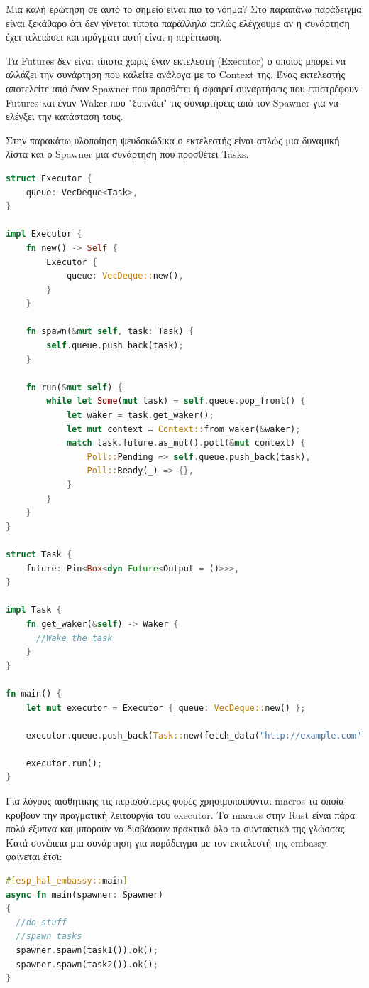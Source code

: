 Μια καλή ερώτηση σε αυτό το σημείο είναι πιο το νόημα? Στο παραπάνω παράδειγμα
είναι ξεκάθαρο ότι δεν γίνεται τίποτα παράλληλα απλώς ελέγχουμε αν η συνάρτηση
έχει τελειώσει και πράγματι αυτή είναι η περίπτωση.

Τα Futures δεν είναι τίποτα χωρίς έναν εκτελεστή (Executor) ο οποίος μπορεί να αλλάζει
την συνάρτηση που καλείτε ανάλογα με το Context της. Ένας εκτελεστής αποτελείτε από
έναν Spawner που προσθέτει ή αφαιρεί συναρτήσεις που επιστρέφουν Futures και έναν Waker
που "ξυπνάει" τις συναρτήσεις από τον Spawner για να ελέγξει την κατάσταση τους.

Στην παρακάτω υλοποίηση ψευδοκώδικα ο εκτελεστής είναι απλώς μια δυναμική λίστα και ο
Spawner μια συνάρτηση που προσθέτει Tasks. 

\begin{lstlisting}[language=Rust]
struct Executor {
    queue: VecDeque<Task>,
}

impl Executor {
    fn new() -> Self {
        Executor {
            queue: VecDeque::new(),
        }
    }

    fn spawn(&mut self, task: Task) {
        self.queue.push_back(task);
    }

    fn run(&mut self) {
        while let Some(mut task) = self.queue.pop_front() {
            let waker = task.get_waker();
            let mut context = Context::from_waker(&waker);
            match task.future.as_mut().poll(&mut context) {
                Poll::Pending => self.queue.push_back(task),
                Poll::Ready(_) => {},
            }
        }
    }
}

struct Task {
    future: Pin<Box<dyn Future<Output = ()>>>,
}

impl Task {
    fn get_waker(&self) -> Waker {
      //Wake the task
    }
}

fn main() {
    let mut executor = Executor { queue: VecDeque::new() };

    executor.queue.push_back(Task::new(fetch_data("http://example.com")));

    executor.run();
}
\end{lstlisting}

Για λόγους αισθητικής τις περισσότερες φορές χρησιμοποιούνται macros τα οποία
κρύβουν την πραγματική λειτουργία του executor. Τα macros στην Rust είναι πάρα
πολύ έξυπνα και μπορούν να διαβάσουν πρακτικά όλο το συντακτικό της γλώσσας. Κατά
συνέπεια μια συνάρτηση για παράδειγμα με τον εκτελεστή της embassy φαίνεται έτσι:

\begin{lstlisting}[language=Rust]
#[esp_hal_embassy::main]
async fn main(spawner: Spawner)
{
  //do stuff
  //spawn tasks
  spawner.spawn(task1()).ok();
  spawner.spawn(task2()).ok();
}
\end{lstlisting}

